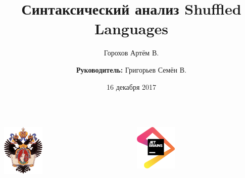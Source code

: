 \documentclass{beamer}
\title[]{Синтаксический анализ Shuffled Languages}
\institute[СПбГУ]{ Санкт-Петербургский Государственный Университет }
\author[Горохов Артем]{Горохов Артём В. \\
    \and  
    {\bfseries Руководитель:} Григорьев Семён В. \\
}
\date{16 декабря 2017}
\begin{document}
 

\begin{frame}
	\begin{center} 
		\begin{columns}
			\begin{column}{3cm}
			\includegraphics[width=2cm]{pictures/SPbGU_Logo.png}
			
			\end{column}
			\begin{column}{3cm}
				 \includegraphics[width=2cm]{pictures/jb.png}
				
			\end{column}
			\end{columns}	
	\end{center}
	\titlepage
\end{frame}
\end{document}
